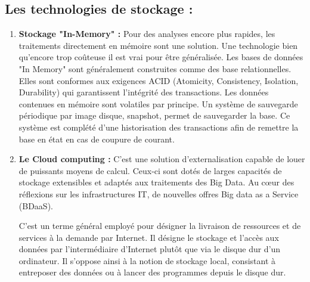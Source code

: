 \subsection{Les technologies de stockage :}
\begin{enumerate}
\item  \textbf{Stockage "In-Memory" :}
Pour des analyses encore plus rapides, les traitements directement en mémoire sont une solution. Une technologie bien qu'encore trop coûteuse il est vrai pour être généralisée. Les bases de données "In Memory" sont généralement construites comme des base relationnelles. Elles sont conformes aux exigences ACID (Atomicity, Consistency, Isolation, Durability) qui garantissent l'intégrité des transactions. Les données contenues en mémoire sont volatiles par principe. Un système de sauvegarde périodique par image disque, snapshot, permet de sauvegarder la base. Ce système est complété d'une historisation des transactions afin de remettre la base en état en cas de coupure de courant.

\item \textbf{Le Cloud computing :}
C’est une solution d'externalisation capable de louer de puissants moyens de calcul. Ceux-ci sont dotés de larges capacités de stockage extensibles et adaptés aux traitements des Big Data. Au cœur des réflexions sur les infrastructures IT, de nouvelles offres Big data as a Service (BDaaS).

C'est un terme général employé pour désigner la livraison de ressources et de services à la demande par Internet. Il désigne le stockage et l'accès aux données par l'intermédiaire d'Internet plutôt que via le disque dur d'un ordinateur. Il s'oppose ainsi à la notion de stockage local, consistant à entreposer des données ou à lancer des programmes depuis le disque dur.

\end{enumerate}

\cite{fernandez_les_2017}
